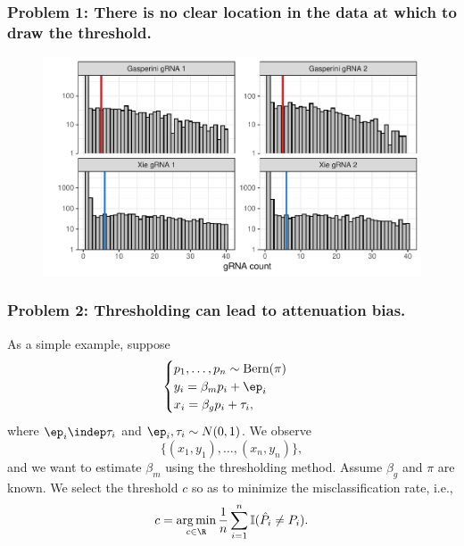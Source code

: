 \documentclass{beamer}
\DeclareMathOperator*{\argmin}{arg\,min}
\begin{document}
\begin{frame}
\frametitle{Problem 1: There is no clear location in the data at which to draw the threshold.}
\begin{figure}
	\centering
	\includegraphics[width=1\linewidth]{../figures/fig2/histograms}
\end{figure}


\end{frame}


\begin{frame}
\frametitle{Problem 2: Thresholding can lead to attenuation bias.}


As a simple example, suppose
$$
\begin{cases}
p_1, \dots, p_n \sim \textrm{Bern}(\pi) \\
y_i = \beta_m p_i + \ep_i \\
x_i = \beta_g p_i + \tau_i,
\end{cases}
$$
where $\ep_i \indep \tau_i$ and $\ep_i, \tau_i \sim N(0,1)$. We observe
$$ \{(x_1, y_1), \dots, (x_n, y_n)\},$$ and we want to estimate $\beta_m$ using the thresholding method. Assume $\beta_g$ and $\pi$ are known. We select the threshold $c$ so as to minimize the misclassification rate, i.e., $$c = \argmin_{c \in \R} \frac{1}{n} \sum_{i=1}^n \mathbb{I}(\hat{P}_i \neq P_i).$$

\end{frame}
\end{document}
